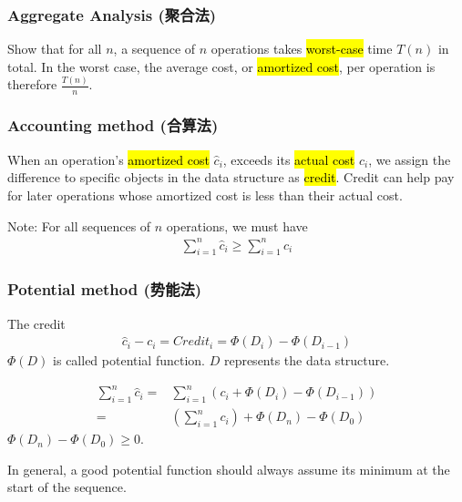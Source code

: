 \subsubsection{Aggregate Analysis (聚合法)}
Show that for all $n$, a sequence of $n$ operations takes \hl{worst-case} time $T(n)$ in total. In the worst case, the average cost, or \hl{amortized cost}, per operation is therefore $\frac{T(n)}{n}$. 

\subsubsection{Accounting  method (合算法)}
When an operation's \hl{amortized cost} $\hat{c}_i$, exceeds its \hl{actual cost} $c_i$, we assign the difference to specific objects in the data structure as \hl{credit}. Credit can help pay for later operations whose amortized cost is less than their actual cost. 

Note: For all sequences of $n$ operations, we must have
\begin{align*}
    \sum_{i=1}^n\hat{c}_i\ge \sum_{i=1}^n c_i
\end{align*}

\subsubsection{Potential method (势能法)}

The credit 
\begin{align*}
    \hat{c}_i-c_i=Credit_i=\Phi(D_i)-\Phi(D_{i-1})
\end{align*}
$\Phi(D)$ is called potential function. $D$ represents the data structure. 

\begin{align*}
    \sum_{i=1}^n\hat{c}_i=&\sum_{i=1}^n \left(  c_i +\Phi(D_i)-\Phi(D_{i-1}) \right)\\
    =&\left(\sum_{i=1}^n c_i\right) + \Phi(D_n)-\Phi(D_0)
\end{align*}
$\Phi(D_n)-\Phi(D_0) \ge 0$. 

In general, a good potential function should always assume its minimum at the start of the sequence. 
 

